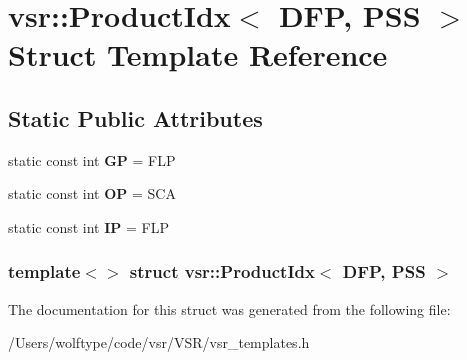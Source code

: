 \hypertarget{structvsr_1_1_product_idx_3_01_d_f_p_00_01_p_s_s_01_4}{\section{vsr\-:\-:Product\-Idx$<$ D\-F\-P, P\-S\-S $>$ Struct Template Reference}
\label{structvsr_1_1_product_idx_3_01_d_f_p_00_01_p_s_s_01_4}
}
\subsection*{Static Public Attributes}
\begin{DoxyCompactItemize}
\item 
\hypertarget{structvsr_1_1_product_idx_3_01_d_f_p_00_01_p_s_s_01_4_a0c59e4a9fa8d346cb08cc7e20a3b636c}{static const int {\bfseries G\-P} = F\-L\-P}\label{structvsr_1_1_product_idx_3_01_d_f_p_00_01_p_s_s_01_4_a0c59e4a9fa8d346cb08cc7e20a3b636c}

\item 
\hypertarget{structvsr_1_1_product_idx_3_01_d_f_p_00_01_p_s_s_01_4_a5ce082b6aeb89ab1e58490d3f5db8b9b}{static const int {\bfseries O\-P} = S\-C\-A}\label{structvsr_1_1_product_idx_3_01_d_f_p_00_01_p_s_s_01_4_a5ce082b6aeb89ab1e58490d3f5db8b9b}

\item 
\hypertarget{structvsr_1_1_product_idx_3_01_d_f_p_00_01_p_s_s_01_4_aaa990983042beea8ca2767fd30a6c7ec}{static const int {\bfseries I\-P} = F\-L\-P}\label{structvsr_1_1_product_idx_3_01_d_f_p_00_01_p_s_s_01_4_aaa990983042beea8ca2767fd30a6c7ec}

\end{DoxyCompactItemize}
\subsubsection*{template$<$$>$ struct vsr\-::\-Product\-Idx$<$ D\-F\-P, P\-S\-S $>$}



The documentation for this struct was generated from the following file\-:\begin{DoxyCompactItemize}
\item 
/\-Users/wolftype/code/vsr/\-V\-S\-R/vsr\-\_\-templates.\-h\end{DoxyCompactItemize}

